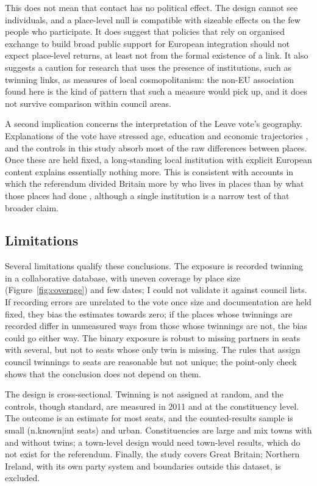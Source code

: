 \documentclass[11pt,a4paper]{article}
\begin{document}
This does not mean that contact has no political effect. The design cannot see individuals, and a place-level null is compatible with sizeable effects on the few people who participate. It does suggest that policies that rely on organised exchange to build broad public support for European integration should not expect place-level returns, at least not from the formal existence of a link. It also suggests a caution for research that uses the presence of institutions, such as twinning links, as measures of local cosmopolitanism: the non-EU association found here is the kind of pattern that such a measure would pick up, and it does not survive comparison within council areas.

A second implication concerns the interpretation of the Leave vote's geography. Explanations of the vote have stressed age, education and economic trajectories \citep{becker2017,jennings2016}, and the controls in this study absorb most of the raw differences between places. Once these are held fixed, a long-standing local institution with explicit European content explains essentially nothing more. This is consistent with accounts in which the referendum divided Britain more by who lives in places than by what those places had done \citep{hobolt2016,johnston2018}, although a single institution is a narrow test of that broader claim.

\subsection{Limitations}
Several limitations qualify these conclusions. The exposure is recorded twinning in a collaborative database, with uneven coverage by place size (Figure~\ref{fig:coverage}) and few dates; I could not validate it against council lists. If recording errors are unrelated to the vote once size and documentation are held fixed, they bias the estimates towards zero; if the places whose twinnings are recorded differ in unmeasured ways from those whose twinnings are not, the bias could go either way. The binary exposure is robust to missing partners in seats with several, but not to seats whose only twin is missing. The rules that assign council twinnings to seats are reasonable but not unique; the point-only check shows that the conclusion does not depend on them.

The design is cross-sectional. Twinning is not assigned at random, and the controls, though standard, are measured in 2011 and at the constituency level. The outcome is an estimate for most seats, and the counted-results sample is small ({{n.known|int}} seats) and urban. Constituencies are large and mix towns with and without twins; a town-level design would need town-level results, which do not exist for the referendum. Finally, the study covers Great Britain; Northern Ireland, with its own party system and boundaries outside this dataset, is excluded.
\end{document}

